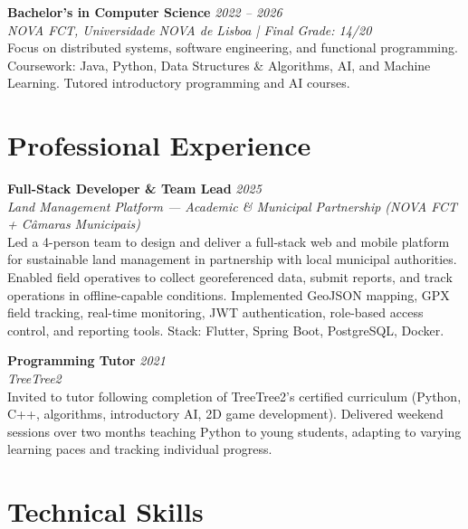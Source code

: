 \documentclass[a4paper,10pt]{article}
\newcommand{\entryspace}{\vspace{3pt}}
\begin{document}
\entryspace

\noindent\textbf{Bachelor's in Computer Science} \hfill \textit{2022 -- 2026}\\
\textit{NOVA FCT, Universidade NOVA de Lisboa \quad | \quad Final Grade: 14/20}\\
Focus on distributed systems, software engineering, and functional programming. Coursework: Java, Python, Data Structures \& Algorithms, AI, and Machine Learning. Tutored introductory programming and AI courses.

\section*{Professional Experience}

\noindent\textbf{Full-Stack Developer \& Team Lead} \hfill \textit{2025}\\
\textit{Land Management Platform — Academic \& Municipal Partnership (NOVA FCT + Câmaras Municipais)}\\
Led a 4-person team to design and deliver a full-stack web and mobile platform for sustainable land management in partnership with local municipal authorities. Enabled field operatives to collect georeferenced data, submit reports, and track operations in offline-capable conditions. Implemented GeoJSON mapping, GPX field tracking, real-time monitoring, JWT authentication, role-based access control, and reporting tools. Stack: Flutter, Spring Boot, PostgreSQL, Docker.

\entryspace

\noindent\textbf{Programming Tutor} \hfill \textit{2021}\\
\textit{TreeTree2}\\
Invited to tutor following completion of TreeTree2's certified curriculum (Python, C++, algorithms, introductory AI, 2D game development). Delivered weekend sessions over two months teaching Python to young students, adapting to varying learning paces and tracking individual progress.

\section*{Technical Skills}
\end{document}
